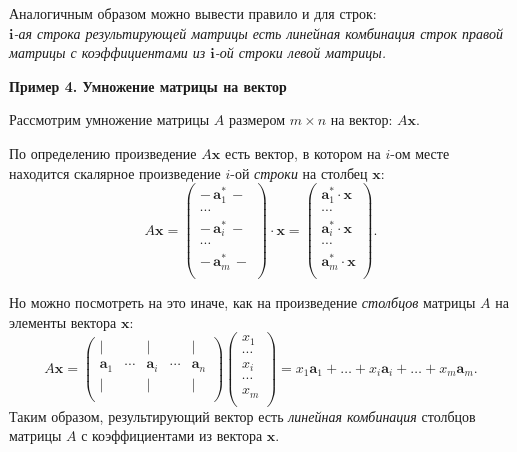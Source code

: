 \documentclass[11pt,a4paper]{article}
\begin{document}
Аналогичным образом можно вывести правило и для строк:\\
\emph{\(\mathbf{i}\)-ая строка результирующей матрицы есть линейная
комбинация строк правой матрицы с коэффициентами из \(\mathbf{i}\)-ой
строки левой матрицы.}

    \textbf{Пример 4. Умножение матрицы на вектор}

Рассмотрим умножение матрицы \(A\) размером \(m \times n\) на вектор:
\(A \mathbf{x}\).

По определению произведение \(A \mathbf{x}\) есть вектор, в котором на
\(i\)-ом месте находится скалярное произведение \(i\)-ой \emph{строки}
на столбец \(\mathbf{x}\): \[
  A \mathbf{x} =
  \begin{pmatrix}
    -\, \mathbf{a}_1^* \,- \\
    \cdots \\
    -\, \mathbf{a}_i^* \,- \\
    \cdots \\
    -\, \mathbf{a}_m^* \,- \\
  \end{pmatrix}
  \cdot \mathbf{x} =
  \begin{pmatrix}
    \mathbf{a}_1^* \cdot \mathbf{x} \\
    \cdots \\
    \mathbf{a}_i^* \cdot \mathbf{x} \\
    \cdots \\
    \mathbf{a}_m^* \cdot \mathbf{x} \\
  \end{pmatrix}.
\]

Но можно посмотреть на это иначе, как на произведение \emph{столбцов}
матрицы \(A\) на элементы вектора \(\mathbf{x}\): \[
  A \mathbf{x} =
  \begin{pmatrix}
     | & {} & | & {} & | \\
     \mathbf{a}_1 & \cdots & \mathbf{a}_i & \cdots & \mathbf{a}_n \\
     | & {} & | & {} & | \\
  \end{pmatrix}
  \begin{pmatrix}
     x_1    \\
     \cdots \\
     x_i    \\
     \cdots \\
     x_m \\
  \end{pmatrix}
  =
  x_1 \mathbf{a}_1 + \dots + x_i \mathbf{a}_i + \dots + x_m \mathbf{a}_m.
\] Таким образом, результирующий вектор есть \emph{линейная комбинация}
столбцов матрицы \(A\) с коэффициентами из вектора \(\mathbf{x}\).
\end{document}
